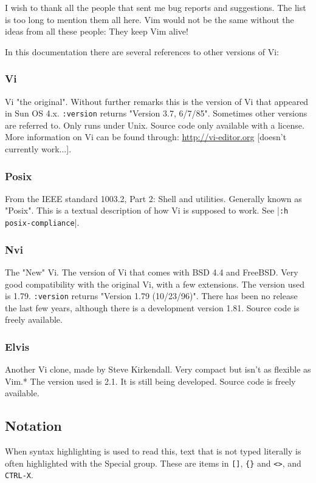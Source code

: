 I wish to thank all the people that sent me bug reports and suggestions.
The list is too long to mention them all here.
Vim would not be the same without the ideas from all these people: They keep Vim alive!

In this documentation there are several references to other versions of Vi:

\subsubsection{Vi}
\label{Vi}
\label{vi}
Vi "the original".
Without further remarks this is the version of Vi that appeared in Sun OS 4.x.
\texttt{:version} returns "Version 3.7, 6/7/85".
Sometimes other versions are referred to.
Only runs under Unix.
Source code only available with a license.
More information on Vi can be found through: \url{http://vi-editor.org} [doesn't currently work...].

\subsubsection{Posix}
\label{Posix}
From the IEEE standard 1003.2, Part 2: Shell and utilities.
Generally known as "Posix".
This is a textual description of how Vi is supposed to work.
See |\texttt{:h posix-compliance}|.

\subsubsection{Nvi}
\label{Nvi}
The "New" Vi.
The version of Vi that comes with BSD 4.4 and FreeBSD.
Very good compatibility with the original Vi, with a few extensions.
The version used is 1.79.
\texttt{:version} returns "Version 1.79 (10/23/96)".
There has been no release the last few years, although there is a development version 1.81.
Source code is freely available.

\subsubsection{Elvis}
\label{Elvis}
Another Vi clone, made by Steve Kirkendall.
Very compact but isn't as flexible as Vim.*
The version used is 2.1.
It is still being developed.
Source code is freely available.

\subsection{Notation}
\label{notation}
When syntax highlighting is used to read this, text that is not typed literally is often highlighted with the Special group.
These are items in \texttt{[]}, \texttt{\{\}} and \texttt{<>}, and \texttt{CTRL-X}.

